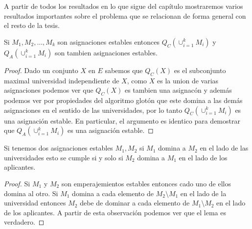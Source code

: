 A partir de todos los resultados en lo que sigue del capítulo mostraremos varios resultados importantes sobre el problema que se relacionan de forma general con el resto de la tesis. 

\begin{teo}
\label{union de estables}
Si $M_1,M_2,\dots,M_k$ son asignaciones estables entonces $Q_C( \cup_{i=1}^k M_i)$ y $Q_A( \cup_{i=1}^k M_i)$ son tambien asignaciones estables. 
\end{teo}
\begin{proof}
Dado un conjunto $X$ en $E$ sabemos que $Q_C(X)$ es el subconjunto maximal universidad independiente de $X$, como $X$ es la union de varias asignaciones podemos ver que $Q_C(X)$ es tambien una asignacón y además podemos ver por propiedades del algoritmo glotón que este domina a las demás asignaciones en el sentido de las universidades, por lo tanto  $Q_C( \cup_{i=1}^k M_i)$ es una asignación estable. En particular, el argumento es identico para demostrar que $Q_A( \cup_{i=1}^k M_i)$ es una asignación estable. 
\end{proof}

\begin{lem}
\label{desigualdad}
Si tenemos dos asignaciones estables $M_1,M_2$ si $M_1$ domina a $M_2$ en el lado de las universidades esto se cumple si y solo si $M_2$ domina a $M_1$ en el lado de los aplicantes.
\end{lem}
\begin{proof}
Si $M_1$ y $M_2$ son emperajemientos estables entonces cado uno de ellos domina al otro. Si $M_1$ domina a cada elemento de $M_2 \setminus M_1$ en el lado de la universidad entonces $M_2$ debe de dominar a cada elemento de $M_1 \setminus M_2$ en el lado de los aplicantes. A partir de esta observación podemos ver que el lema es verdadero.
\end{proof}

